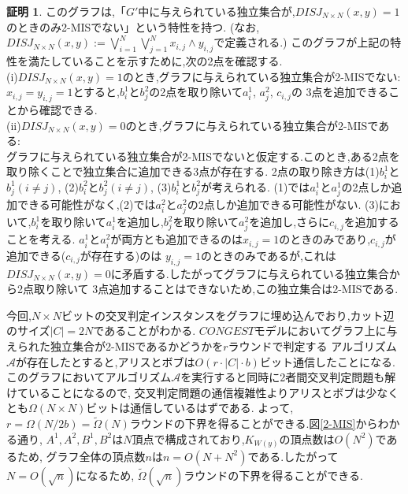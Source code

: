 \documentclass[12pt]{thesis}
\theoremstyle{definition}
\newtheorem*{prf*}{証明}
\begin{document}
\begin{prf*}
このグラフは,「$G'$中に与えられている独立集合が,$DISJ_{N \times N} (x, y) = 1$のときのみ2-MISでない」という特性を持つ. 
(なお,$DISJ_{N \times N} (x, y) :=\bigvee_{i = 1}^{N} \bigvee_{j = 1}^{N} x_{i, j} \land y_{i, j}$で定義される.)
このグラフが上記の特性を満たしていることを示すために,次の2点を確認する. \\
(i)$DISJ_{N \times N} (x, y) = 1$のとき,グラフに与えられている独立集合が2-MISでない: \\
$x_{i, j} = y_{i, j} =1$とすると,$b_{i}^{1}$と$b_{j}^{2}$の2点を取り除いて$a_{i}^{1}$, $a_{j}^{2}$, $c_{i, j}$の
3点を追加できることから確認できる. \\
(ii)$DISJ_{N \times N} (x, y) = 0$のとき,グラフに与えられている独立集合が2-MISである: \\ 
グラフに与えられている独立集合が2-MISでないと仮定する.このとき,ある2点を取り除くことで独立集合に追加できる3点が存在する.
2点の取り除き方は(1)$b_{i}^{1}$と$b_{j}^{1}(i \neq j)$, (2)$b_{i}^{2}$と$b_{j}^{2}(i \neq j)$, (3)$b_{i}^{1}$と$b_{j}^{2}$が考えられる.
(1)では$a_{i}^{1}$と$a_{j}^{1}$の2点しか追加できる可能性がなく,(2)では$a_{i}^{2}$と$a_{j}^{2}$の2点しか追加できる可能性がない.
(3)において,$b_{i}^{1}$を取り除いて$a_{i}^{1}$を追加し,$b_{j}^{2}$を取り除いて$a_{j}^{2}$を追加し,さらに$c_{i, j}$を追加することを考える.
$a_{i}^{1}$と$a_{i}^{2}$が両方とも追加できるのは$x_{i, j} = 1$のときのみであり,$c_{i, j}$が追加できる($c_{i, j}$が存在する)のは
$y_{i, j} = 1$のときのみであるが,これは$DISJ_{N \times N} (x, y) = 0$に矛盾する.したがってグラフに与えられている独立集合から2点取り除いて
3点追加することはできないため,この独立集合は2-MISである.

今回,$N \times N$ビットの交叉判定インスタンスをグラフに埋め込んでおり,カット辺のサイズ$|C| = 2N$であることがわかる.
$CONGEST$モデルにおいてグラフ上に与えられた独立集合が2-MISであるかどうかを$r$ラウンドで判定する
アルゴリズム$\mathcal{A}$が存在したとすると,アリスとボブは$O(r \cdot |C| \cdot b)$ビット通信したことになる.
このグラフにおいてアルゴリズム$\mathcal{A}$を実行すると同時に2者間交叉判定問題も解けていることになるので,
交叉判定問題の通信複雑性よりアリスとボブは少なくとも$\Omega (N \times N)$ビットは通信しているはずである.
よって,$r = \Omega (N / 2b) = \tilde{\Omega}(N)$ラウンドの下界を得ることができる.図\ref{2-MIS}からわかる通り,
$A^{1}, A^{2}, B^{1}, B^{2}$は$N$頂点で構成されており,$K_{W(y)}$の頂点数は$O(N^{2})$であるため,
グラフ全体の頂点数$n$は$n = O(N + N^{2})$である.したがって$N = O(\sqrt{n})$になるため,
$\tilde{\Omega}(\sqrt{n})$ラウンドの下界を得ることができる. 
\end{prf*}
\newpage
\end{document}
